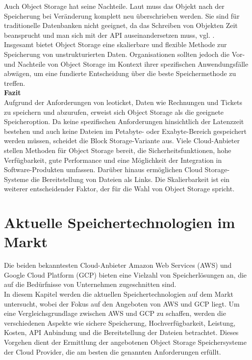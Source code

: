 Auch Object Storage hat seine Nachteile. Laut \citeauthor{redHat-storage} muss das Objekt nach der Speicherung bei Veränderung komplett neu überschrieben werden. Sie sind für traditionelle Datenbanken nicht geeignet, da das Schreiben von Objekten Zeit beansprucht und man sich mit der API auseinandersetzen muss, vgl. \citeauthor{redHat-storage}.\\

Insgesamt bietet Object Storage eine skalierbare und flexible Methode zur Speicherung von unstrukturierten Daten. Organisationen sollten jedoch die Vor- und Nachteile von Object Storage im Kontext ihrer spezifischen Anwendungsfälle abwägen, um eine fundierte Entscheidung über die beste Speichermethode zu treffen.\\


\textbf{Fazit}\\

Aufgrund der Anforderungen von leoticket, Daten wie Rechnungen und Tickets zu speichern und abzurufen, erweist sich Object Storage als die geeignete Speicheroption. Da keine spezifischen Anforderungen hinsichtlich der Latenzzeit bestehen und auch keine Dateien im Petabyte- oder Exabyte-Bereich gespeichert werden müssen, scheidet die Block Storage-Variante aus. Viele Cloud-Anbieter stellen Methoden für Object Storage bereit, die Sicherheitsfunktionen, hohe Verfügbarkeit, gute Performance und eine Möglichkeit der Integration in Software-Produkten umfassen. Darüber hinaus ermöglichen Cloud Storage-Systeme die Bereitstellung von Dateien als Links. Die Skalierbarkeit ist ein weiterer entscheidender Faktor, der für die Wahl von Object Storage spricht.

\newpage

\section{Aktuelle Speichertechnologien im Markt}

Die beiden bekanntesten Cloud-Anbieter Amazon Web Services (AWS) und Google Cloud Platform (GCP) bieten eine Vielzahl von Speicherlösungen an, die auf die Bedürfnisse von Unternehmen zugeschnitten sind.\\ 

In diesem Kapitel werden die aktuellen Speichertechnologien auf dem Markt untersucht, wobei der Fokus auf den Angeboten von AWS und GCP liegt. Um eine Vergleichsgrundlage zwischen AWS und GCP zu schaffen, werden die verschiedenen Aspekte wie sichere Speicherung, Hochverfügbarkeit, Leistung, Kosten, API Anbindung und die Bereitstellung der Dateien betrachtet. Dieses Vorgehen dient der Ermittlung der angebotenen Object Storage Speichersysteme der Cloud Provider, die am besten die genannten Anforderungen erfüllt.\\

